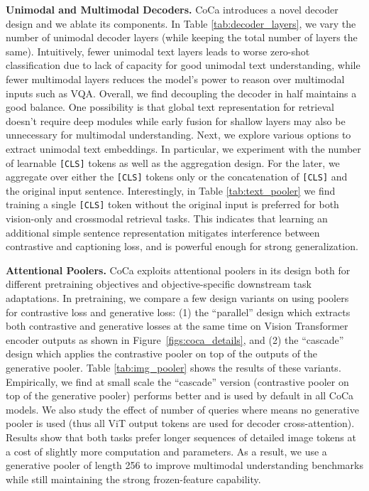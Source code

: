 \textbf{Unimodal and Multimodal Decoders.}
CoCa introduces a novel decoder design and we ablate its components.
In Table \ref{tab:decoder_layers},
we vary the number of unimodal decoder layers (while keeping the total number of layers the same).
Intuitively,
fewer unimodal text layers leads to worse zero-shot classification due to lack of capacity for good unimodal text understanding,
while fewer multimodal layers reduces the model's power to reason over multimodal inputs such as VQA.
Overall, we find decoupling the decoder in half maintains a good balance.
One possibility is that global text representation for retrieval doesn't require deep modules \cite{pham2021combined} while early fusion for shallow layers may also be unnecessary for multimodal understanding.
Next, we explore various options to extract unimodal text embeddings.
In particular, 
we experiment with the number of learnable \verb+[CLS]+ tokens as well as the aggregation design.
For the later,
we aggregate over either the \verb+[CLS]+ tokens only or the concatenation of \verb+[CLS]+ and the original input sentence.
Interestingly, in Table \ref{tab:text_pooler}
we find training a single \verb+[CLS]+ token without the original input
is preferred for both vision-only and crossmodal retrieval tasks.
This indicates that learning an additional simple sentence representation mitigates interference between contrastive and captioning loss,
and is powerful enough for strong generalization.


\textbf{Attentional Poolers.}
CoCa exploits attentional poolers in its design both for different pretraining objectives and objective-specific downstream task adaptations.
In pretraining, we compare a few design variants on using poolers for contrastive loss and generative loss: (1) the ``parallel'' design which extracts both contrastive and generative losses at the same time on Vision Transformer encoder outputs as shown in Figure~\ref{figs:coca_details}, and (2) the ``cascade'' design which applies the contrastive pooler on top of the outputs of the generative pooler. Table \ref{tab:img_pooler} shows the results of these variants.
Empirically,
we find at small scale the ``cascade'' version (contrastive pooler on top of the generative pooler) performs better and is used by default in all CoCa models.
We also study the effect of number of queries where  means no generative pooler is used (thus all ViT output tokens are used for decoder cross-attention).
Results show that both tasks prefer longer sequences of detailed image tokens at a cost of slightly more computation and parameters.
As a result,
we use a generative pooler of length 256 to improve multimodal understanding benchmarks while still maintaining the strong frozen-feature capability.